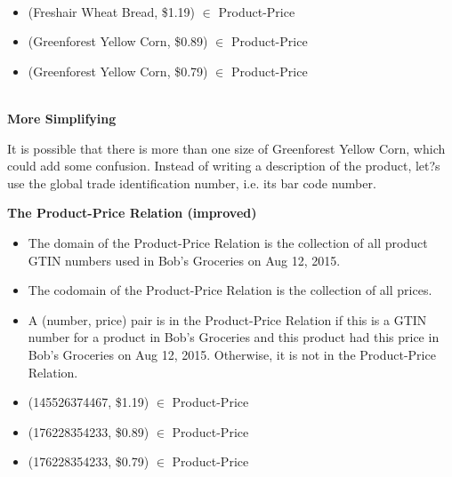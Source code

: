 \documentclass{ximera}
\begin{document}
\quad \\



\begin{example}
\begin{itemize}
\item (Freshair Wheat Bread, \$1.19) $\in$ Product-Price
\item (Greenforest Yellow Corn, \$0.89) $\in$ Product-Price
\item (Greenforest Yellow Corn, \$0.79) $\in$ Product-Price
 \end{itemize}
 \end{example}


\quad \\




\textbf{More Simplifying} 

It is possible that there is more than one size of Greenforest Yellow Corn, which could add some confusion.  Instead of writing a description of the product, let?s use the global trade identification number, i.e. its bar code number.


\begin{definition}
\textbf{The Product-Price Relation (improved)}
\begin{itemize}
\item The domain of the Product-Price Relation is the collection of all product GTIN numbers used in Bob's Groceries on Aug 12, 2015. 
\item The codomain of the Product-Price Relation is the collection of all prices. 
\item A (number, price) pair is in the Product-Price Relation if this is a GTIN number for a product in Bob's Groceries and this product had this price in Bob's Groceries on Aug 12, 2015. Otherwise, it is not in the Product-Price Relation.
\end{itemize}
\end{definition}



\begin{example}
\begin{itemize}
\item (145526374467, \$1.19) $\in$ Product-Price
\item (176228354233, \$0.89) $\in$ Product-Price
\item (176228354233, \$0.79) $\in$ Product-Price
 \end{itemize}
 \end{example}
\end{document}
